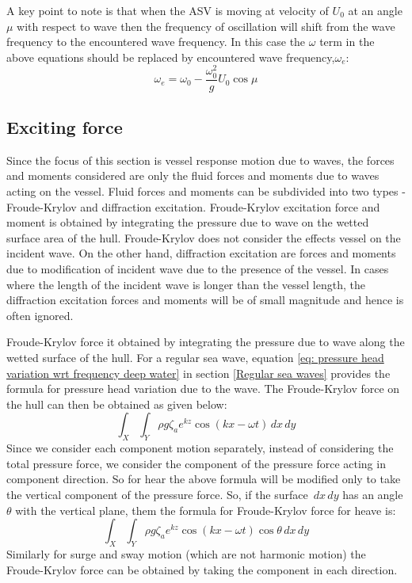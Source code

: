 A key point to note is that when the ASV is moving at velocity of $U_0$ at an angle $\mu$ with respect to wave then the frequency of oscillation will shift from the wave frequency to the encountered wave frequency. In this case the $\omega$ term in the above equations should be replaced by encountered wave frequency,$\omega_e$:
\begin{equation}
  \omega_e = \omega_0 - \frac{\omega_0^2}{g} U_0 \cos \mu 
  \label{eq: encountered wave frequency }  
\end{equation}


\subsection{Exciting force}

Since the focus of this section is vessel response motion due to waves, the
forces and moments considered are only the fluid forces and moments due to waves
acting on the vessel. Fluid forces and moments can be subdivided into two types - Froude-Krylov and diffraction excitation. Froude-Krylov excitation force and
moment is obtained by integrating the pressure due to wave on the wetted surface
area of the hull. Froude-Krylov does not consider the effects vessel on the
incident wave. On the other hand, diffraction excitation are forces and moments
due to modification of incident wave due to the presence of the vessel. In cases
where the length of the incident wave is longer than the vessel length, the
diffraction excitation forces and moments will be of small magnitude and hence
is often ignored. 

Froude-Krylov force it obtained by integrating the pressure due to wave along the wetted surface of the hull. For a regular sea wave, equation \ref{eq: pressure head variation wrt frequency deep water} in section \ref{Regular sea waves} provides the formula for pressure head variation due to the wave. The Froude-Krylov force on the hull can then be obtained as given below:
\begin{equation}
  \int_X \int_Y \rho g \zeta_a e^{k z} \cos (k x - \omega t) \,dx \,dy 
\end{equation}
Since we consider each component motion separately, instead of considering the total pressure force, we consider the component of the pressure force acting in component direction. So for hear the above formula will be modified only to take the vertical component of the pressure force. So, if the surface $\,dx \,dy$ has an angle $\theta$ with the vertical plane, them the formula for Froude-Krylov force for heave is: 
\begin{equation}
  \int_X \int_Y \rho g \zeta_a e^{k z} \cos (k x - \omega t) \cos \theta \,dx \,dy 
\end{equation}  
Similarly for surge and sway motion (which are not harmonic motion) the Froude-Krylov force can be obtained by taking the component in each direction.
